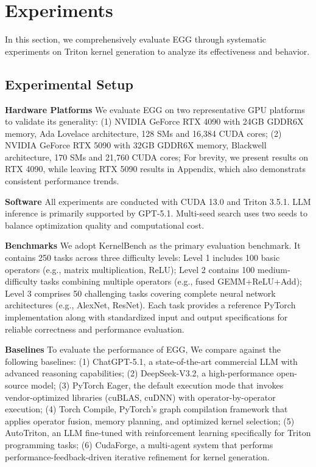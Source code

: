 \documentclass{article}
\theoremstyle{plain}
\theoremstyle{definition}
\theoremstyle{remark}
\begin{document}
\section{Experiments}
In this section, we comprehensively evaluate EGG through systematic experiments on Triton kernel generation to analyze its effectiveness and behavior.

\subsection{Experimental Setup}
\textbf{Hardware Platforms} We evaluate EGG on two representative GPU platforms to validate its generality:
(1) NVIDIA GeForce RTX 4090 with 24GB GDDR6X memory, Ada Lovelace architecture, 128 SMs and 16,384 CUDA cores;
(2) NVIDIA GeForce RTX 5090 with 32GB GDDR6X memory, Blackwell architecture, 170 SMs and 21,760 CUDA cores;
For brevity, we present results on RTX 4090, 
while leaving RTX 5090 results in Appendix, which also demonstrats consistent performance trends.


\textbf{Software} All experiments are conducted with CUDA 13.0 and Triton 3.5.1. LLM inference is primarily supported by GPT-5.1.  Multi-seed search uses two seeds to balance optimization quality and computational cost.

\textbf{Benchmarks}
We adopt KernelBench\cite{ouyang2025kernelbench} as the primary evaluation benchmark. It contains 250 tasks across three difficulty levels: Level 1 includes 100 basic operators (e.g., matrix multiplication, ReLU); Level 2 contains 100 medium-difficulty tasks combining multiple operators (e.g., fused GEMM+ReLU+Add); Level 3 comprises 50 challenging tasks covering complete neural network architectures (e.g., AlexNet, ResNet). Each task provides a reference PyTorch implementation along with standardized input and output specifications for reliable correctness and performance evaluation.

\textbf{Baselines}
To evaluate the performance of EGG, We compare against the following baselines:
(1) ChatGPT-5.1\cite{openai_chatgpt_5_1}, a state-of-the-art commercial LLM with advanced reasoning capabilities;
(2) DeepSeek-V3.2\cite{liu2025deepseek}, a high-performance open-source model;
(3) PyTorch Eager, the default execution mode that invokes vendor-optimized libraries (cuBLAS, cuDNN) with operator-by-operator execution;
(4) Torch Compile\cite{ansel2024pytorch}, PyTorch's graph compilation framework that applies operator fusion, memory planning, and optimized kernel selection;
(5) AutoTriton\cite{li2025autotriton}, an LLM fine-tuned with reinforcement learning specifically for Triton programming tasks;
(6) CudaForge\cite{zhang2025cudaforge}, a multi-agent system that performs performance-feedback-driven iterative refinement for kernel generation.
\end{document}
